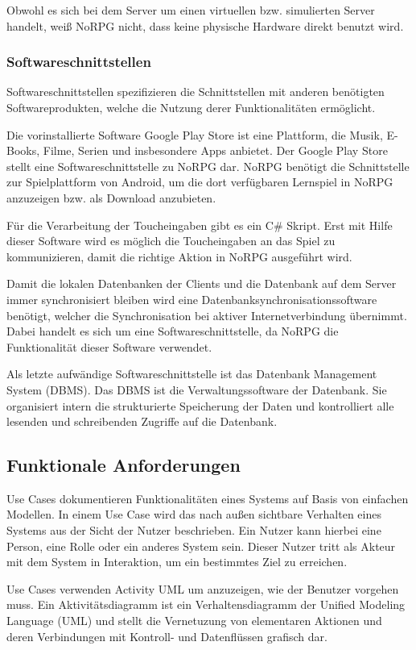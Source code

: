 			Obwohl es sich bei dem Server um einen virtuellen bzw. simulierten Server handelt, weiß NoRPG nicht, dass keine physische Hardware direkt benutzt wird. 
			
		\subsubsection{Softwareschnittstellen}
			Softwareschnittstellen spezifizieren die Schnittstellen mit anderen benötigten Softwareprodukten, welche die Nutzung derer Funktionalitäten ermöglicht.
			
			Die vorinstallierte Software Google Play Store ist eine Plattform, die Musik, E-Books, Filme, Serien und insbesondere Apps anbietet. Der Google Play Store stellt eine Softwareschnittstelle zu NoRPG dar. NoRPG benötigt die Schnittstelle zur Spielplattform von Android, um die dort verfügbaren Lernspiel in NoRPG anzuzeigen bzw. als Download anzubieten.
			
			Für die Verarbeitung der Toucheingaben gibt es ein C\# Skript. Erst mit Hilfe dieser Software wird es möglich die Toucheingaben an das Spiel zu kommunizieren, damit die richtige Aktion in NoRPG ausgeführt wird.
			
			Damit die lokalen Datenbanken der Clients und die Datenbank auf dem Server immer synchronisiert bleiben wird eine Datenbanksynchronisationssoftware benötigt, welcher die Synchronisation bei aktiver Internetverbindung übernimmt. Dabei handelt es sich um eine Softwareschnittstelle, da NoRPG die Funktionalität dieser Software verwendet.
			
			Als letzte aufwändige Softwareschnittstelle ist das Datenbank Management System (DBMS). Das DBMS ist die Verwaltungssoftware der Datenbank. Sie organisiert intern die strukturierte Speicherung der Daten und kontrolliert alle lesenden und schreibenden Zugriffe auf die Datenbank.

	\subsection{Funktionale Anforderungen}
		Use Cases dokumentieren Funktionalitäten eines Systems auf Basis von einfachen Modellen. In einem Use Case wird das nach außen sichtbare Verhalten eines Systems aus der Sicht der Nutzer beschrieben. Ein Nutzer kann hierbei eine Person, eine Rolle oder ein anderes System sein. Dieser Nutzer tritt als Akteur mit dem System in Interaktion, um ein bestimmtes Ziel zu erreichen. %
		
		Use Cases verwenden Activity UML um anzuzeigen, wie der Benutzer vorgehen muss. Ein Aktivitätsdiagramm ist ein Verhaltensdiagramm der Unified Modeling Language (UML) und stellt die Vernetuzung von elementaren Aktionen und deren Verbindungen mit Kontroll- und Datenflüssen grafisch dar.
	
